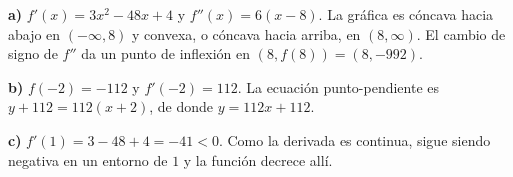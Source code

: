 \textbf{a)} $f'(x)=3x^2-48x+4$ y $f''(x)=6(x-8)$. La gráfica es cóncava hacia abajo en $(-\infty,8)$ y convexa, o cóncava hacia arriba, en $(8,\infty)$. El cambio de signo de $f''$ da un punto de inflexión en $(8,f(8))=\boxed{(8,-992)}$.

\textbf{b)} $f(-2)=-112$ y $f'(-2)=112$. La ecuación punto-pendiente es $y+112=112(x+2)$, de donde $\boxed{y=112x+112}$.

\textbf{c)} $f'(1)=3-48+4=-41<0$. Como la derivada es continua, sigue siendo negativa en un entorno de $1$ y la función decrece allí.
